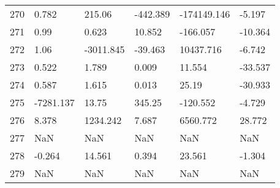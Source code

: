 \documentclass[11pt]{article}
\begin{document}
\begin{center}
\begin{longtable}{llllll}
        270 & 0.782      & 215.06                 & -442.389          & -174149.146        & -5.197   \\
        271 & 0.99       & 0.623                  & 10.852            & -166.057           & -10.364  \\
        272 & 1.06       & -3011.845              & -39.463           & 10437.716          & -6.742   \\
        273 & 0.522      & 1.789                  & 0.009             & 11.554             & -33.537  \\
        274 & 0.587      & 1.615                  & 0.013             & 25.19              & -30.933  \\
        275 & -7281.137  & 13.75                  & 345.25            & -120.552           & -4.729   \\
        276 & 8.378      & 1234.242               & 7.687             & 6560.772           & 28.772   \\
        277 & NaN        & NaN                    & NaN               & NaN                & NaN      \\
        278 & -0.264     & 14.561                 & 0.394             & 23.561             & -1.304   \\
        279 & NaN        & NaN                    & NaN               & NaN                & NaN       
    \end{longtable}
    \end{center}
    \pagebreak
\end{document}
